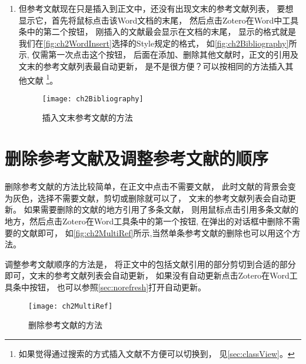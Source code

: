 \documentclass[cn,11pt,chinese]{elegantbook}
\begin{document}
\begin{enumerate}
\begin{figure}[htbp]
				\label{fig:ch2ZoteroSearch}
			\end{figure}
			\item
			但参考文献现在只是插入到正文中，还没有出现文末的参考文献列表，
			要想显示它，首先将鼠标点击该Word文档的末尾，
			然后点击Zotero在Word中工具条中的第二个按钮，
			刚插入的文献最会显示在文档的末尾，
			显示的格式就是我们在\autoref{fig:ch2WordInsert}选择的Style规定的格式，
			如\autoref{fig:ch2Bibliography}所示,
			仅需第一次点击这个按钮，
			后面在添加、删除其他文献时，正文的引用及文末的参考文献列表最自动更新，
			是不是很方便？可以按相同的方法插入其他文献
			\footnote{如果觉得通过搜索的方式插入文献不方便可以切换到，
			见\cref{sec:classView}。}。
			
			\begin{figure}[htbp]
				\centering
				\texttt{[image: ch2Bibliography]}
				\caption{插入文末参考文献的方法}
				\label{fig:ch2Bibliography}
			\end{figure}
		\end{enumerate}
		\section{删除参考文献及调整参考文献的顺序}
			删除参考文献的方法比较简单，在正文中点击不需要文献，
			此时文献的背景会变为灰色，选择不需要文献，剪切或删除就可以了，
			文末的参考文献列表会自动更新。
			如果需要删除的文献的地方引用了多条文献，
			则用鼠标点击引用多条文献的地方，然后点击Zotero在Word工具条中的第一个按钮,
			在弹出的对话框中删除不需要的文献即可，
			如\autoref{fig:ch2MultiRef}所示,当然单条参考文献的删除也可以用这个方法。
			
			调整参考文献顺序的方法是，
			将正文中的包括文献引用的部分剪切到合适的部分即可，文末的参考文献列表会自动更新，
			如果没有自动更新点击Zotero在Word工具条中按钮，
			也可以参照\cref{sec:norefresh}打开自动更新。
			
			\begin{figure}[htbp]
				\centering
				\texttt{[image: ch2MultiRef]}
				\caption{删除参考文献的方法}
				\label{fig:ch2MultiRef}
			\end{figure}
\end{document}
